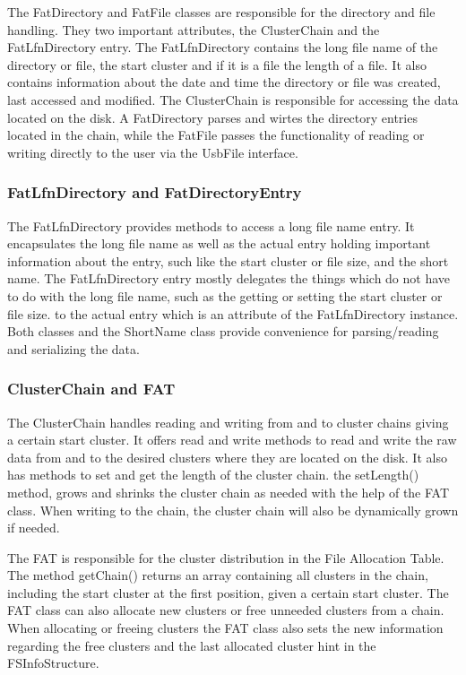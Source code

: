 The FatDirectory and FatFile classes are responsible for the directory and file handling. They two important attributes, the ClusterChain and the FatLfnDirectory entry. The FatLfnDirectory contains the long file name of the directory or file, the start cluster and if it is a file the length of a file. It also contains information about the date and time the directory or file was created, last accessed and modified. 
The ClusterChain is responsible for accessing the data located on the disk. A FatDirectory parses and wirtes the directory entries located in the chain, while the FatFile passes the functionality of reading or writing directly to the user via the UsbFile interface.

\subsubsection{FatLfnDirectory and FatDirectoryEntry}

The FatLfnDirectory provides methods to access a long file name entry. It encapsulates the long file name as well as the actual entry holding important information about the entry, such like the start cluster or file size, and the short name. The FatLfnDirectory entry mostly delegates the things which do not have to do with the long file name, such as the getting or setting the start cluster or file size. to the actual entry which is an attribute of the FatLfnDirectory instance. Both classes and the ShortName class provide convenience for parsing/reading and serializing the data. 

\subsubsection{ClusterChain and FAT}

The ClusterChain handles reading and writing from and to cluster chains giving a certain start cluster. It offers read and write methods to read and write the raw data from and to the desired clusters where they are located on the disk. It also has methods to set and get the length of the cluster chain. the setLength() method, grows and shrinks the cluster chain as needed with the help of the FAT class. When writing to the chain, the cluster chain will also be dynamically grown if needed.

The FAT is responsible for the cluster distribution in the File Allocation Table. The method getChain() returns an array containing all clusters in the chain, including the start cluster at the first position, given a certain start cluster. The FAT class can also allocate new clusters or free unneeded clusters from a chain. When allocating or freeing clusters the FAT class also sets the new information regarding the free clusters and the last allocated cluster hint in the FSInfoStructure.

